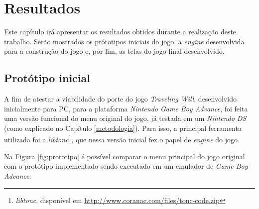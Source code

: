 \chapter[Resultados]{Resultados}

Este capítulo irá apresentar os resultados obtidos durante a realização deste trabalho. Serão mostrados os prótotipos iniciais do jogo, a \textit{engine} desenvolvida para a construção do jogo e, por fim, as telas do jogo final desenvolvido.

\section{Protótipo inicial}

A fim de atestar a viabilidade do porte do jogo \textit{Traveling Will}, desenvolvido inicialmente para PC, para a plataforma \textit{Nintendo Game Boy Advance}, foi feita uma versão funcional do menu original do jogo, já testada em um \textit{Nintendo DS} (como explicado no Capítulo \ref{metodologia}). Para isso, a principal ferramenta utilizada foi a \textit{libtonc}\footnote{\textit{libtonc}, disponível em \url{http://www.coranac.com/files/tonc-code.zip}}, que nessa versão inicial fez o papel de \textit{engine} do jogo.

Na Figura \ref{fig:prototipo} é possível comparar o menu principal do jogo original com o protótipo implementado sendo executado em um emulador de \textit{Game Boy Advance}:

